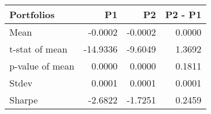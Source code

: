 \begin{tabular}{lrrr}
\toprule
Portfolios & P1 & P2 & P2 - P1 \\
\midrule
Mean & -0.0002 & -0.0002 & 0.0000 \\
t-stat of mean & -14.9336 & -9.6049 & 1.3692 \\
p-value of mean & 0.0000 & 0.0000 & 0.1811 \\
Stdev & 0.0001 & 0.0001 & 0.0001 \\
Sharpe & -2.6822 & -1.7251 & 0.2459 \\
\bottomrule
\end{tabular}
